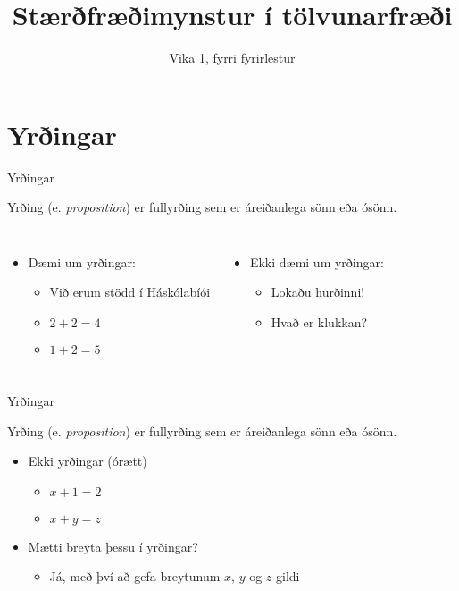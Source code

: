 \documentclass{beamer}
\title{Stærðfræðimynstur í tölvunarfræði}
\subtitle{Vika 1, fyrri fyrirlestur}
\begin{document}
\begin{frame}
\titlepage
\end{frame}

\section{Yrðingar}

\begin{frame}{Yrðingar}
\begin{tcolorbox}[title=Yrðing]
Yrðing (e. \emph{proposition}) er fullyrðing sem er áreiðanlega sönn eða ósönn.
\end{tcolorbox}
\begin{columns}
\begin{itemize}
 \item Dæmi um yrðingar:
 \begin{itemize}
  \item Við erum stödd í Háskólabíói
  \item $2 + 2 = 4$
  \item $1 + 2 = 5$
 \end{itemize}
\end{itemize}
\begin{itemize}
 \item Ekki dæmi um yrðingar:
 \begin{itemize}
  \item Lokaðu hurðinni!
  \item Hvað er klukkan?
 \end{itemize}
\end{itemize}
\end{columns}
\end{frame}

\begin{frame}{Yrðingar}
\begin{tcolorbox}[title=Yrðing]
Yrðing (e. \emph{proposition}) er fullyrðing sem er áreiðanlega sönn eða ósönn.
\end{tcolorbox}
\begin{itemize}
 \item Ekki yrðingar (órætt)
 \begin{itemize}
  \item $x + 1 = 2$
  \item $x + y = z$
 \end{itemize} \pause
 \item Mætti breyta þessu í yrðingar?\pause
 \begin{itemize}
  \item Já, með því að gefa breytunum $x$, $y$ og $z$ gildi
 \end{itemize}
\end{itemize}
\end{frame}
\end{document}
